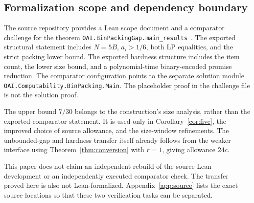 \documentclass[11pt,a4paper]{article}
\theoremstyle{definition}
\theoremstyle{remark}
\begin{document}
\subsection{Formalization scope and dependency boundary}\label{sec:formal-boundary}
The source repository provides a Lean scope document and a comparator challenge for the theorem \texttt{OAI.BinPackingGap.main\_results}~\cite{OAILean26}. The exported structural statement includes $N=5B$, $a_i>1/6$, both LP equalities, and the strict packing lower bound. The exported hardness structure includes the item count, the lower size bound, and a polynomial-time binary-encoded promise reduction. The comparator configuration points to the separate solution module \texttt{OAI.Computability.}\allowbreak\texttt{BinPacking.Main}. The placeholder proof in the challenge file is not the solution proof.

The upper bound $7/30$ belongs to the construction's size analysis, rather than the exported comparator statement. It is used only in Corollary~\ref{cor:five}, the improved choice of source allowance, and the size-window refinements. The unbounded-gap and hardness transfer itself already follows from the weaker interface using Theorem~\ref{thm:conversion} with $r=1$, giving allowance $24c$.

This paper does not claim an independent rebuild of the source Lean development or an independently executed comparator check. The transfer proved here is also not Lean-formalized. Appendix~\ref{app:source} lists the exact source locations so that these two verification tasks can be separated.
\end{document}

